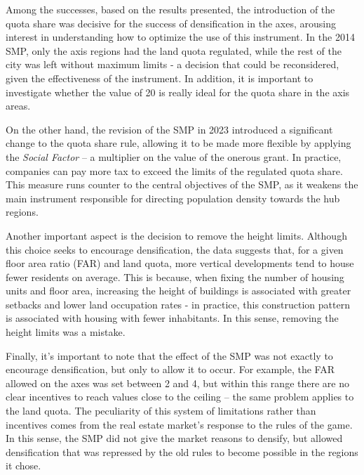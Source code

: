 Among the successes, based on the results presented, the introduction of the quota share was decisive for the success of densification in the axes, arousing interest in understanding how to optimize the use of this instrument. In the 2014 SMP, only the axis regions had the land quota regulated, while the rest of the city was left without maximum limits - a decision that could be reconsidered, given the effectiveness of the instrument. In addition, it is important to investigate whether the value of 20 is really ideal for the quota share in the axis areas.

On the other hand, the revision of the SMP in 2023 introduced a significant change to the quota share rule, allowing it to be made more flexible by applying the \textit{Social Factor} -- a multiplier on the value of the onerous grant. In practice, companies can pay more tax to exceed the limits of the regulated quota share. This measure runs counter to the central objectives of the SMP, as it weakens the main instrument responsible for directing population density towards the hub regions.

Another important aspect is the decision to remove the height limits. Although this choice seeks to encourage densification, the data suggests that, for a given floor area ratio (FAR) and land quota, more vertical developments tend to house fewer residents on average. This is because, when fixing the number of housing units and floor area, increasing the height of buildings is associated with greater setbacks and lower land occupation rates - in practice, this construction pattern is associated with housing with fewer inhabitants. In this sense, removing the height limits was a mistake.

Finally, it's important to note that the effect of the SMP was not exactly to encourage densification, but only to allow it to occur. For example, the FAR allowed on the axes was set between 2 and 4, but within this range there are no clear incentives to reach values close to the ceiling -- the same problem applies to the land quota. The peculiarity of this system of limitations rather than incentives comes from the real estate market's response to the rules of the game. In this sense, the SMP did not give the market reasons to densify, but allowed densification that was repressed by the old rules to become possible in the regions it chose.

